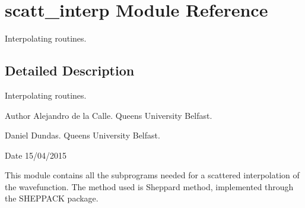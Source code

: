 \hypertarget{namespacescatt__interp}{}\section{scatt\+\_\+interp Module Reference}
\label{namespacescatt__interp}


Interpolating routines.  




\subsection{Detailed Description}
Interpolating routines. 

\begin{DoxyAuthor}{Author}
Alejandro de la Calle. Queen\textquotesingle{}s University Belfast. 

Daniel Dundas. Queen\textquotesingle{}s University Belfast. 
\end{DoxyAuthor}
\begin{DoxyDate}{Date}
15/04/2015
\end{DoxyDate}
This module contains all the subprograms needed for a scattered interpolation of the wavefunction. The method used is Sheppard method, implemented through the S\+H\+E\+P\+P\+A\+CK package. 